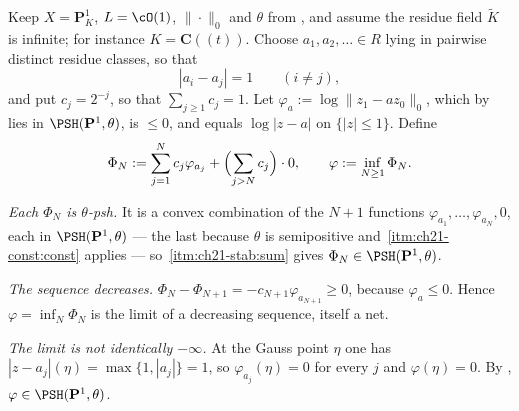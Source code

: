 \begin{example}
\label{ex:ch21-polar-noncompact}
Keep \(X=\mathbf P^1_K\), \(L=\cO(1)\), \(\|\cdot\|_0\) and \(\theta\) from
, and assume the residue field
\(\widetilde K\) is infinite; for instance \(K=\mathbf C((t))\).  Choose
\(a_1,a_2,\ldots\in R\) lying in pairwise distinct residue classes, so that
\begin{equation}
\label{eq:ch21-separated-centres}
 |a_i-a_j|=1\qquad(i\neq j),
\end{equation}
and put \(c_j=2^{-j}\), so that \(\sum_{j\geq1}c_j=1\).  Let
\(\varphi_{a}:=\log\lVert z_1-az_0\rVert_0\), which by
 lies in \(\PSH(\mathbf P^1,\theta)\), is
\(\leq0\), and equals \(\log|z-a|\) on \(\{|z|\leq1\}\).  Define
\begin{equation}
\label{eq:ch21-polar-series}
 \Phi_N:=\sum_{j=1}^{N}c_j\varphi_{a_j}
        +\Bigl(\sum_{j>N}c_j\Bigr)\cdot 0,
 \qquad
 \varphi:=\inf_{N\geq1}\Phi_N .
\end{equation}

\emph{Each \(\Phi_N\) is \(\theta\)-psh.}  It is a convex combination of the
\(N+1\) functions \(\varphi_{a_1},\ldots,\varphi_{a_N},0\), each in
\(\PSH(\mathbf P^1,\theta)\) --- the last because \(\theta\) is semipositive
and \,\cref{itm:ch21-const:const} applies --- so
\,\cref{itm:ch21-stab:sum} gives
\(\Phi_N\in\PSH(\mathbf P^1,\theta)\).

\emph{The sequence decreases.}  \(\Phi_N-\Phi_{N+1}
=-c_{N+1}\varphi_{a_{N+1}}\geq0\), because
\(\varphi_{a}\leq0\).  Hence \(\varphi=\inf_N\Phi_N\) is the limit of a
decreasing sequence, itself a net.

\emph{The limit is not identically \(-\infty\).}  At the Gauss point
\(\eta\) one has \(|z-a_j|(\eta)=\max\{1,|a_j|\}=1\), so
\(\varphi_{a_j}(\eta)=0\) for every \(j\) and \(\varphi(\eta)=0\).  By
,
\(\varphi\in\PSH(\mathbf P^1,\theta)\).


\end{example}
